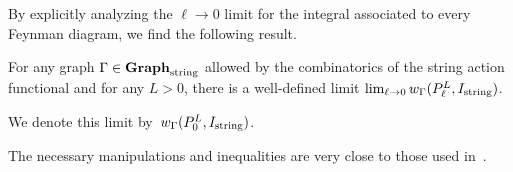 \subsubsection{}

By explicitly analyzing the $\ell \to 0$ limit for the integral associated to every Feynman diagram,
we find the following result.

\begin{prop}
For any graph $\Gamma \in {\bf Graph}_{\rm string}$ allowed by the combinatorics of the string action functional and for any $L > 0$,
there is a well-defined limit $\lim_{\ell \to 0} w_{\Gamma}(P_{\ell}^L,I_{\rm string})$.
\end{prop}

We denote this limit by~$w_{\Gamma}(P_{0}^L,I_{\rm string})$.

The necessary manipulations and inequalities are very close to those used in~\cite{wg2, GGW}.

